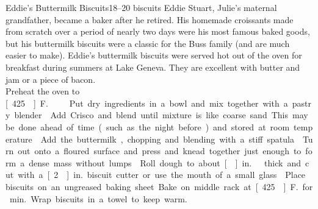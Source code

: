\begin{recipe}{Eddie's Buttermilk Biscuits}{18--20 biscuits}{}
\freeform Eddie Stuart, Julie's maternal grandfather, became a baker after he retired. His homemade croissants made from scratch over a period of nearly two days were his most famous baked goods, but his buttermilk biscuits were a classic for the Buss family (and are much easier to make). Eddie's buttermilk biscuits were served hot out of the oven for breakfast during summers at Lake Geneva. They are excellent with butter and jam or a piece of bacon.\\
\vspace{1mm}
\newstep Preheat the oven to \unit[425\0]{F.}
Put dry ingredients in a bowl and mix together with a pastry blender.
Add Crisco and blend until mixture is like coarse sand.  This may be done ahead of time (such as the night before) and stored at room temperature.
Add the buttermilk, chopping and blending with a stiff spatula.
\newstep Turn out onto a floured surface and press and knead together just enough to form a dense mass without lumps.
\newstep Roll dough to about \unit[]{in.}\ thick and cut with a \unit[2]{in.} biscuit cutter or use the mouth of a small glass.
\newstep Place biscuits on an ungreased baking sheet. Bake on middle rack at \unit[425\0]{F.} for \unit[13]{min.} Wrap biscuits in a towel to keep warm.
\end{recipe}
